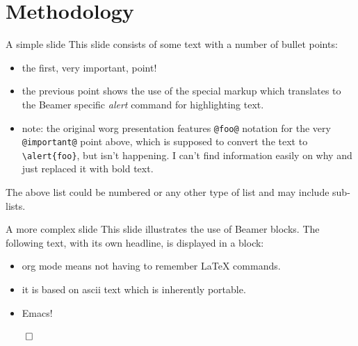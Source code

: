 \documentclass[bigger]{beamer}
\begin{document}
\section{Methodology}
\label{sec:orgab466d8}
\begin{frame}[label={sec:org62a74ca},fragile]{A simple slide}
 This slide consists of some text with a number of bullet points:

\begin{itemize}
\item the first, very \alert{important}, point!
\item the previous point shows the use of the special markup which
translates to the Beamer specific \emph{alert} command for highlighting
text.
\item note: the original worg presentation features \texttt{@foo@} notation for the very
\texttt{@important@} point above, which is supposed to convert the text to \texttt{\textbackslash{}alert\{foo\}}, but
isn't happening. I can't find information easily on why and just replaced it with bold text.
\end{itemize}

The above list could be numbered or any other type of list and may
include sub-lists.
\end{frame}

\begin{frame}[label={sec:org1eeda91}]{A more complex slide}
This slide illustrates the use of Beamer blocks.  The following text,
with its own headline, is displayed in a block:

\begin{theorem}
\begin{itemize}
\item org mode means not having to remember \LaTeX{} commands.
\item it is based on ascii text which is inherently portable.
\item Emacs!
\end{itemize}

\hfill \(\qed\)
\end{theorem}
\end{frame}
\end{document}
